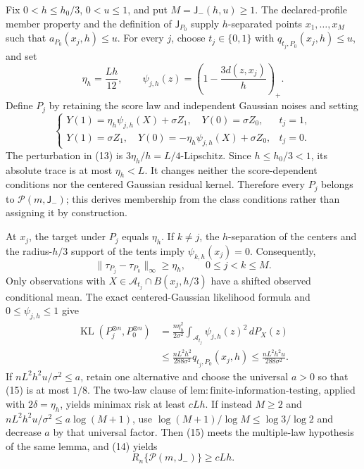 Fix \(0<h\le h_0/3\), \(0<u\le1\), and put \(M=\mathsf J_{-}(h,u)\ge1\).  The declared-profile member property and the definition of \(\mathsf J_{P_0}\) supply \(h\)-separated points \(x_1,\ldots,x_M\) such that \(a_{P_0}(x_j,h)\le u\).  For every \(j\), choose \(t_j\in\{0,1\}\) with \(q_{t_j,P_0}(x_j,h)\le u\), and set
\[
 \eta_h=\frac{Lh}{12},
 \qquad
 \psi_{j,h}(z)=\left(1-\frac{3d(z,x_j)}h\right)_+. \tag{12}
\]
Define \(P_j\) by retaining the score law and independent Gaussian noises and setting
\[
 \begin{cases}
 Y(1)=\eta_h\psi_{j,h}(X)+\sigma Z_1,\quad Y(0)=\sigma Z_0,&t_j=1,\\
 Y(1)=\sigma Z_1,\quad Y(0)=-\eta_h\psi_{j,h}(X)+\sigma Z_0,&t_j=0.
 \end{cases} \tag{13}
\]
The perturbation in (13) is \(3\eta_h/h=L/4\)-Lipschitz.  Since \(h\le h_0/3<1\), its absolute trace is at most \(\eta_h<L\).  It changes neither the score-dependent conditions nor the centered Gaussian residual kernel.  Therefore every \(P_j\) belongs to \(\mathcal P(m,\mathsf J_{-})\); this derives membership from the class conditions rather than assigning it by construction.

At \(x_j\), the target under \(P_j\) equals \(\eta_h\).  If \(k\ne j\), the \(h\)-separation of the centers and the radius-\(h/3\) support of the tents imply \(\psi_{k,h}(x_j)=0\).  Consequently,
\[
 \|\tau_{P_j}-\tau_{P_k}\|_\infty\ge\eta_h,
 \qquad 0\le j<k\le M. \tag{14}
\]
Only observations with \(X\in\mathcal A_{t_j}\cap B(x_j,h/3)\) have a shifted observed conditional mean.  The exact centered-Gaussian likelihood formula and \(0\le\psi_{j,h}\le1\) give
\[
 \begin{aligned}
 \operatorname{KL}(P_j^{\otimes n},P_0^{\otimes n})
 &=\frac{n\eta_h^2}{2\sigma^2}
   \int_{\mathcal A_{t_j}}\psi_{j,h}(z)^2\,dP_X(z)\\
 &\le\frac{nL^2h^2}{288\sigma^2}
   q_{t_j,P_0}(x_j,h)
 \le\frac{nL^2h^2u}{288\sigma^2}.
 \end{aligned} \tag{15}
\]
If \(nL^2h^2u/\sigma^2\le a\), retain one alternative and choose the universal \(a>0\) so that (15) is at most \(1/8\).  The two-law clause of \(\mathrm{lem:finite\text{-}information\text{-}testing}\), applied with \(2\delta=\eta_h\), yields minimax risk at least \(cLh\).  If instead \(M\ge2\) and \(nL^2h^2u/\sigma^2\le a\log(M+1)\), use \(\log(M+1)/\log M\le\log3/\log2\) and decrease \(a\) by that universal factor.  Then (15) meets the multiple-law hypothesis of the same lemma, and (14) yields
\[
 R_n\{\mathcal P(m,\mathsf J_{-})\}\ge cLh. \tag{16}
\]

